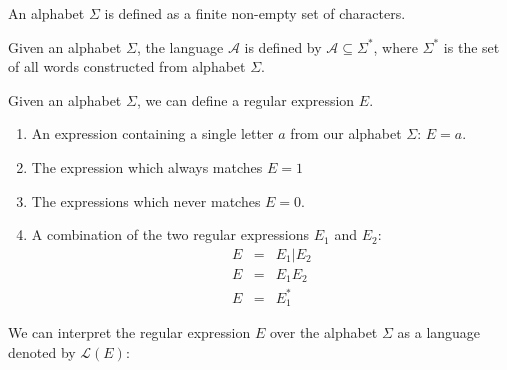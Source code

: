 \documentclass[12pt]{article}
\theoremstyle{definition}
\begin{document}
\begin{definition} An alphabet $\Sigma$ is defined as a finite non-empty set of characters.

\end{definition}

\begin{definition} Given an alphabet $\Sigma$, the language $\mathcal{A}$ is defined by $\mathcal{A} \subseteq \Sigma^*$, where $\Sigma^*$ is the set of all words constructed from alphabet $\Sigma$.
	
\end{definition} 

\begin{definition} Given an alphabet $\Sigma$, we can define a regular expression $E$.\\

	\begin{enumerate}
		\item An expression containing a single letter $a$ from our alphabet $\Sigma$: $E = a$. 
		\item The expression which always matches $E = 1$
		\item The expressions which never matches $E = 0$.
		\item A combination of the two regular expressions $E_1$ and $E_2$:
		\begin{eqnarray}
			E &=& E_1 | E_2 \\
			E &=& E_1E_2 \\
			E &=& E_1^*
		\end{eqnarray}
	\end{enumerate}	
\end{definition} 

\newpage

We can interpret the regular expression $E$ over the alphabet $\Sigma$ as a language denoted by $\mathcal{L}(E)$: \\
\end{document}
